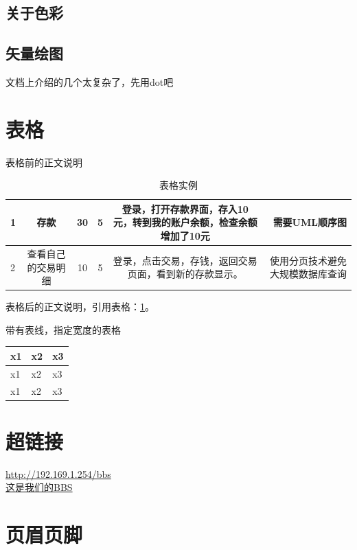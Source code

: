 \documentclass[a4paper,12pt]{article} %
\begin{document}
\subsection{关于色彩} %

\subsection{矢量绘图}
文档上介绍的几个太复杂了，先用dot吧\\


\section{表格}
表格前的正文说明
\begin{table}[!th]
\begin{tabular}{|l|c|c|c|c|r|}
\toprule
1	&存款	&30	&5	&登录，打开存款界面，存入10元，转到我的账户余额，检查余额增加了10元	&需要UML顺序图	\\
\midrule
2	&查看自己的交易明细 &10 &5 &登录，点击交易，存钱，返回交易页面，看到新的存款显示。 &使用分页技术避免大规模数据库查询 \\
\bottomrule
\end{tabular}
\caption{表格实例}
\label{ex:table}
\end{table}
表格后的正文说明，引用表格：\ref{ex:table}。

{带有表线，指定宽度的表格}
\begin{table}[htbp]
  \centering
  \begin{tabular}{|p{80pt}|>{\centering}p{80pt}|>{\raggedleft\arraybackslash}p{80pt}|}
    \toprule
    x1  & x2  & x3\\
    \midrule
    x1  & x2  & x3\\
    x1  & x2  & x3\\
    \bottomrule
  \end{tabular}
\end{table}


\section{超链接}
\url{http://192.169.1.254/bbs}\\
\href{http://192.169.1.254/bbs}{这是我们的BBS}


\section{页眉页脚} %
\end{document}
